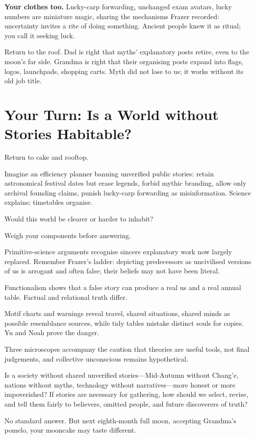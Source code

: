 \textbf{Your clothes too.} Lucky-carp forwarding, unchanged exam avatars, lucky numbers are miniature magic, sharing the mechanisms Frazer recorded: uncertainty invites a rite of doing something. Ancient people knew it as ritual; you call it seeking luck.

Return to the roof. Dad is right that myths' explanatory posts retire, even to the moon's far side. Grandma is right that their organising posts expand into flags, logos, launchpads, shopping carts. Myth did not lose to us; it works without its old job title.

\section[Your Turn: Can We Live without Stories?]{Your Turn: Is a World without Stories Habitable?}
Return to cake and rooftop.

Imagine an efficiency planner banning unverified public stories: retain astronomical festival dates but erase legends, forbid mythic branding, allow only archival founding claims, punish lucky-carp forwarding as misinformation. Science explains; timetables organise.

Would this world be clearer or harder to inhabit?

Weigh your components before answering.

Primitive-science arguments recognise sincere explanatory work now largely replaced. Remember Frazer's ladder: depicting predecessors as uncivilised versions of us is arrogant and often false; their beliefs may not have been literal.

Functionalism shows that a false story can produce a real us and a real annual table. Factual and relational truth differ.

Motif charts and warnings reveal travel, shared situations, shared minds as possible resemblance sources, while tidy tables mistake distinct souls for copies. Yu and Noah prove the danger.

Three microscopes accompany the caution that theories are useful tools, not final judgements, and collective unconscious remains hypothetical.

Is a society without shared unverified stories---Mid-Autumn without Chang'e, nations without myths, technology without narratives---more honest or more impoverished? If stories are necessary for gathering, how should we select, revise, and tell them fairly to believers, omitted people, and future discoverers of truth?

No standard answer. But next eighth-month full moon, accepting Grandma's pomelo, your mooncake may taste different.
